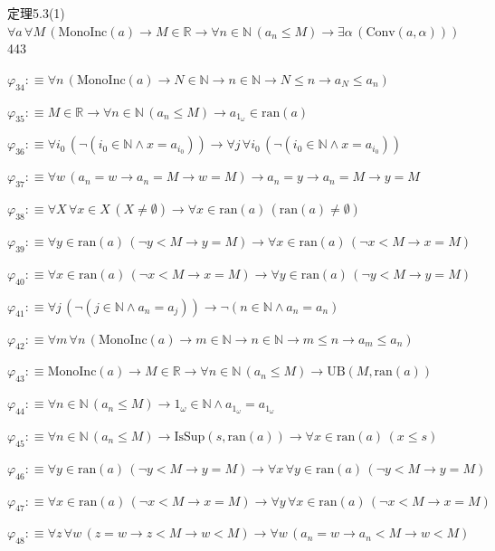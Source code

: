 \begin{fullproof}{定理5.3(1)}{$\forall a\,\forall M\,(\mathrm{MonoInc}(a) \to M \in \mathbb{R} \to \forall n \in \mathbb{N}\,(a_{n} \leq M) \to \exists \alpha\,(\mathrm{Conv}(a,\alpha)))$}{443}
\begin{abbrevlist}
\item $\varphi_{34} :\equiv \forall n\,(\mathrm{MonoInc}(a) \to N \in \mathbb{N} \to n \in \mathbb{N} \to N \leq n \to a_{N} \leq a_{n})$
\item $\varphi_{35} :\equiv M \in \mathbb{R} \to \forall n \in \mathbb{N}\,(a_{n} \leq M) \to a_{1_{\omega}} \in \mathrm{ran}(a)$
\item $\varphi_{36} :\equiv \forall i_{0}\,(\neg (i_{0} \in \mathbb{N} \land x = a_{i_{0}})) \to \forall j\,\forall i_{0}\,(\neg (i_{0} \in \mathbb{N} \land x = a_{i_{0}}))$
\item $\varphi_{37} :\equiv \forall w\,(a_{n} = w \to a_{n} = M \to w = M) \to a_{n} = y \to a_{n} = M \to y = M$
\item $\varphi_{38} :\equiv \forall X\,\forall x \in X\,(X \neq \emptyset) \to \forall x \in \mathrm{ran}(a)\,(\mathrm{ran}(a) \neq \emptyset)$
\item $\varphi_{39} :\equiv \forall y \in \mathrm{ran}(a)\,(\neg y < M \to y = M) \to \forall x \in \mathrm{ran}(a)\,(\neg x < M \to x = M)$
\item $\varphi_{40} :\equiv \forall x \in \mathrm{ran}(a)\,(\neg x < M \to x = M) \to \forall y \in \mathrm{ran}(a)\,(\neg y < M \to y = M)$
\item $\varphi_{41} :\equiv \forall j\,(\neg (j \in \mathbb{N} \land a_{n} = a_{j})) \to \neg (n \in \mathbb{N} \land a_{n} = a_{n})$
\item $\varphi_{42} :\equiv \forall m\,\forall n\,(\mathrm{MonoInc}(a) \to m \in \mathbb{N} \to n \in \mathbb{N} \to m \leq n \to a_{m} \leq a_{n})$
\item $\varphi_{43} :\equiv \mathrm{MonoInc}(a) \to M \in \mathbb{R} \to \forall n \in \mathbb{N}\,(a_{n} \leq M) \to \mathrm{UB}(M,\mathrm{ran}(a))$
\item $\varphi_{44} :\equiv \forall n \in \mathbb{N}\,(a_{n} \leq M) \to 1_{\omega} \in \mathbb{N} \land a_{1_{\omega}} = a_{1_{\omega}}$
\item $\varphi_{45} :\equiv \forall n \in \mathbb{N}\,(a_{n} \leq M) \to \mathrm{IsSup}(s,\mathrm{ran}(a)) \to \forall x \in \mathrm{ran}(a)\,(x \leq s)$
\item $\varphi_{46} :\equiv \forall y \in \mathrm{ran}(a)\,(\neg y < M \to y = M) \to \forall x\,\forall y \in \mathrm{ran}(a)\,(\neg y < M \to y = M)$
\item $\varphi_{47} :\equiv \forall x \in \mathrm{ran}(a)\,(\neg x < M \to x = M) \to \forall y\,\forall x \in \mathrm{ran}(a)\,(\neg x < M \to x = M)$
\item $\varphi_{48} :\equiv \forall z\,\forall w\,(z = w \to z < M \to w < M) \to \forall w\,(a_{n} = w \to a_{n} < M \to w < M)$

\end{abbrevlist}
\end{fullproof}
